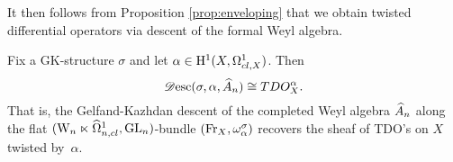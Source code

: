 It then follows from Proposition \ref{prop:enveloping} that we obtain twisted differential operators via descent of the formal Weyl algebra.

\begin{cor}\label{cor:descTDO}
Fix a GK-structure $\sigma$ and let $\alpha \in {\rm H}^1(X, \Omega^1_{cl,X})$. 
Then 
\[
\mathscr{D}{\rm esc}(\sigma, \alpha, \widehat{A}_n) \cong TDO^\alpha_{X}.
\]
That is, the Gelfand-Kazhdan descent of the completed Weyl algebra $\widehat{A}_n$ 
along the flat $({{\rm W}_n} \ltimes \widehat{\Omega}^1_{n,cl}, {\rm GL}_n)$-bundle $({\rm Fr}_X, \omega_\alpha^\sigma)$ 
recovers the sheaf of TDO's on $X$ twisted by~$\alpha$.
\end{cor}


